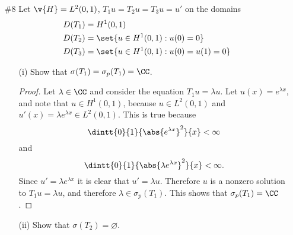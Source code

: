 \documentclass[11pt, oneside]{article}
\begin{document}
\begin{enumerate}
  \pagebreak
  \item[\#8]
    Let $\v{H} = L^2(0, 1)$, $T_1 u = T_2 u = T_3 u = u'$ on the domains
    \begin{align*}
      D(T_1) &= H^1(0, 1) \\
      D(T_2) &= \set{u \in H^1(0,1): u(0) = 0} \\
      D(T_3) &= \set{u \in H^1(0, 1): u(0) = u(1) = 0}
    \end{align*}
    \begin{enumerate}
      \item[(i)] %
        Show that $\sigma(T_1) = \sigma_p(T_1) = \CC$.

        \begin{proof}
          Let $\lambda \in \CC$ and consider the equation $T_1 u = \lambda u$.
          Let $u(x) = e^{\lambda x}$, and note that $u \in H^1(0, 1)$,
          because $u \in L^2(0, 1)$ and $u'(x) = \lambda e^{\lambda x} \in L^2(0, 1)$.
          This is true because
          \[
            \dintt{0}{1}{\abs{e^{\lambda x}}^2}{x} < \infty
          \]
          and
          \[
            \dintt{0}{1}{\abs{\lambda e^{\lambda x}}^2}{x} < \infty.
          \]
          Since $u' = \lambda e^{\lambda x}$ it is clear that $u' = \lambda u$.
          Therefore $u$ is a nonzero solution to $T_1 u = \lambda u$, and
          therefore $\lambda \in \sigma_p(T_1)$.
          This shows that $\sigma_p(T_1) = \CC$.
        \end{proof}

      \item[(ii)] %
        Show that $\sigma(T_2) = \varnothing$.


\end{enumerate}
\end{enumerate}
\end{document}
